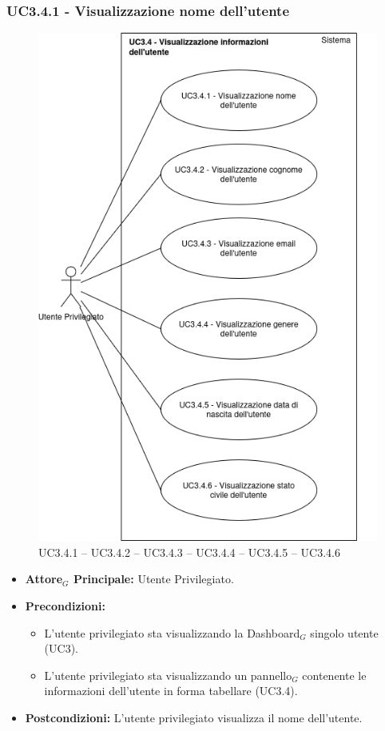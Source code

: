 \documentclass[10pt]{article}
\begin{document}
\begin{justify}
\subsubsection{\textbf{UC3.4.1 - Visualizzazione nome dell'utente}}
\begin{figure}[H]
    \centering
    \includegraphics[width=0.7\linewidth]{UC3.4.1image.png}
    \caption{UC3.4.1 -- UC3.4.2 -- UC3.4.3 -- UC3.4.4 -- UC3.4.5 -- UC3.4.6}
    \label{fig:UC3.4.1}
\end{figure}
\label{UC3.4.1}
\begin{itemize}
     \item \textbf{Attore$_G$ Principale:} Utente Privilegiato.
     \item \textbf{Precondizioni:}
        \begin{itemize}
    	\item L'utente privilegiato sta visualizzando la Dashboard$_G$ singolo utente (UC3).
          \item L'utente privilegiato sta visualizzando un pannello$_G$ contenente le informazioni dell'utente in forma tabellare (UC3.4).
        \end{itemize}
      \item \textbf{Postcondizioni:} L'utente privilegiato visualizza il nome dell'utente. 

\end{itemize}
\end{justify}
\end{document}
